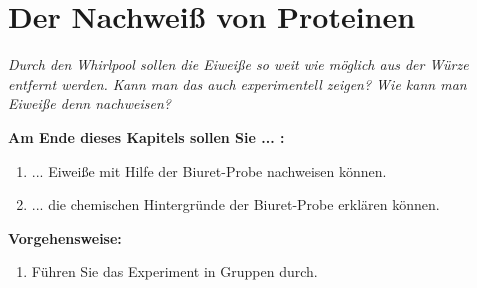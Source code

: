 \documentclass{scrartcl}  %
\begin{document}
\newpage
	\section{Der Nachweiß von Proteinen}
	
		\textit{Durch den Whirlpool sollen die Eiweiße so weit wie möglich aus der Würze entfernt werden. Kann man das auch experimentell zeigen? Wie kann man Eiweiße denn nachweisen?} \newline
	
		\begin{minipage}{0.7\textwidth}
			\noindent \textbf{Am Ende dieses Kapitels sollen Sie ... :}
			\begin{enumerate}
				\item ... Eiweiße mit Hilfe der Biuret-Probe nachweisen können.
				\item ... die chemischen Hintergründe der Biuret-Probe erklären können.
			\end{enumerate}
			\textbf{Vorgehensweise:}
			\begin{enumerate}
				\item Führen Sie das Experiment in Gruppen durch.
			\end{enumerate}
			
		\end{minipage}
		\hspace{0.1\textwidth}
\end{document}
